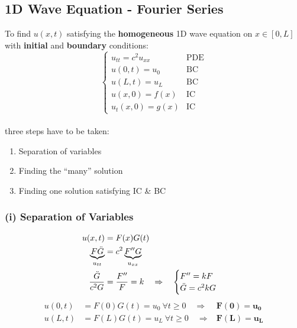\subsection{1D Wave Equation - Fourier Series}\label{ssec:1d_wave_FS}
To find $u(x,t)$ satisfying the \textbf{homogeneous} 1D wave equation on $x\in[0,L]$ with \textbf{initial} and
\textbf{boundary} conditions:
\begin{equation*}
    \begin{cases}
        u_{tt}=c^2u_{xx} & \text{PDE} \\
        u(0,t)=u_0       & \text{BC}  \\
        u(L,t)=u_L       & \text{BC}  \\
        u(x,0)=f(x)      & \text{IC}  \\
        u_t(x,0)=g(x)    & \text{IC}
    \end{cases}
\end{equation*}\\
three steps have to be taken:
\begin{enumerate}[label=\roman*]
    \item Separation of variables
    \item Finding the ``many'' solution
    \item Finding one solution satisfying IC \& BC
\end{enumerate}

\subsubsection{(i) Separation of Variables}
\noindent
\begin{align*}
    u(x,t)                          & =F(x)G(t)                                               \\
    \underbrace{F\ddot{G}}_{u_{tt}} & =c^2\underbrace{F''G}_{u_{xx}}                          \\
    \frac{\ddot{G}}{c^2G}           & =\frac{F''}{F}=k\hspace*{10pt}\Rightarrow\hspace*{10pt}
    \begin{cases}
        F''=kF \\
        \ddot{G}=c^2kG
    \end{cases}
\end{align*}
\begin{align*}
    u(0,t) & =F(0)G(t)=u_0\mathrm{~}\forall t\geq0\quad\Rightarrow & \mathbf{F(0)}=\mathbf{u_0} \\
    u(L,t) & =F(L)G(t)=u_L\mathrm{~}\forall t\geq0\quad\Rightarrow & \mathbf{F(L)}=\mathbf{u_L}
\end{align*}

